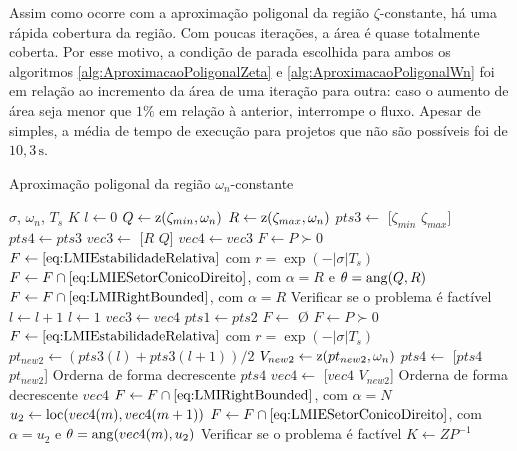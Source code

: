 Assim como ocorre com a aproximação poligonal da região $\zeta$-constante, há uma rápida cobertura da região. Com poucas iterações, a área é quase totalmente coberta. Por esse motivo, a condição de parada escolhida para ambos os algoritmos \ref{alg:AproximacaoPoligonalZeta} e \ref{alg:AproximacaoPoligonalWn} foi em relação ao incremento da área de uma iteração para outra: caso o aumento de área seja menor que $1\%$ em relação à anterior, interrompe o fluxo. Apesar de simples, a média de tempo de execução para projetos que não são possíveis foi de $10,3\,\si{\second}$.

\begin{algorithm}[!ht]
\caption{Aproximação poligonal da região $\omega_n$-constante}\label{alg:AproximacaoPoligonalWn}
\begin{algorithmic}[1]
\Require $\sigma$, $\omega_n$, $T_s$
\Ensure $K$
\State $l \gets 0$
\State $Q \gets \operatorname{\mathrm{z}}(\zeta_{min},\omega_n)$
\State $R \gets \operatorname{\mathrm{z}}(\zeta_{max},\omega_n)$
\State $pts3 \gets$ [$\zeta_{min}$ $\zeta_{max}$]
\State $pts4 \gets pts3$
\State $vec3 \gets$ [$R$ $Q$]
\State $vec4 \gets vec3$
\State $F \gets P \succ 0$
\State $F \gets \eqref{eq:LMIEstabilidadeRelativa}$ com $r = \exp{\left(-|\sigma|T_s\right)}$ 
\State $F \gets F \cap \eqref{eq:LMIESetorConicoDireito}$, com $\alpha = R$ e $\theta = \operatorname{ang}(Q,R)$ 
\State $F \gets F \cap \eqref{eq:LMIRightBounded}$, com $\alpha = R$ 
\State Verificar se o problema é factível
\State $l \gets l + 1$
\Else
\State $l \gets 1$
\State $vec3 \gets vec4$
\State $pts1 \gets pts2$
\EndIf
\State $F \gets$ \O {}
\State $F \gets P \succ 0$
\State $F \gets \eqref{eq:LMIEstabilidadeRelativa}$ com $r = \exp{\left(-|\sigma|T_s\right)}$ 
\State $pt_{new2} \gets (pts3(l)+pts3(l+1))/2$
\State $V_{new2} \gets \operatorname{\mathrm{z}}(pt_{new2}, \omega_n)$
\State $pts4 \gets$ [$pts4$ $pt_{new2}$]
\State Orderna de forma decrescente $pts4$
\State $vec4 \gets$ [$vec4$ $V_{new2}$]
\State Orderna de forma decrescente $vec4$
\State $F \gets F \cap \eqref{eq:LMIRightBounded}$, com $\alpha = N$ 
\State $u_2 \gets \operatorname{loc}(vec4(m),vec4(m+1))$
\State $F \gets F \cap \eqref{eq:LMIESetorConicoDireito}$, com $\alpha = u_2$ e $\theta = \operatorname{ang}(vec4(m),u_2)$
\EndFor
\State Verificar se o problema é factível
\EndWhile
\State $K \gets ZP^{-1}$
\end{algorithmic}
\end{algorithm}